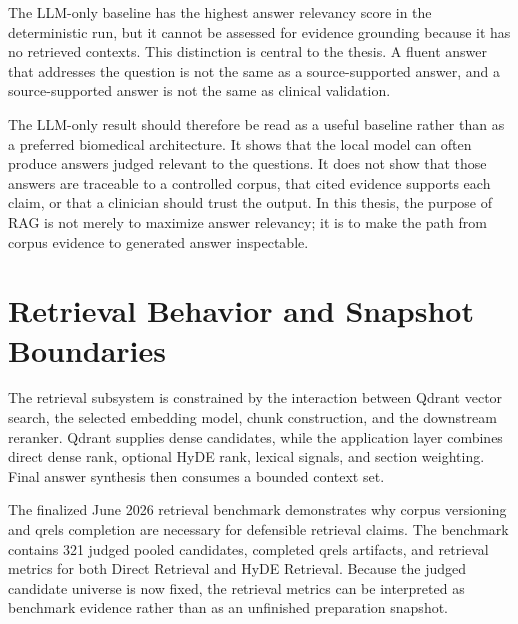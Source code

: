 The LLM-only baseline has the highest answer relevancy score in the deterministic run, but it cannot be assessed for evidence grounding because it has no retrieved contexts. This distinction is central to the thesis. A fluent answer that addresses the question is not the same as a source-supported answer, and a source-supported answer is not the same as clinical validation.

The LLM-only result should therefore be read as a useful baseline rather than as a preferred biomedical architecture. It shows that the local model can often produce answers judged relevant to the questions. It does not show that those answers are traceable to a controlled corpus, that cited evidence supports each claim, or that a clinician should trust the output. In this thesis, the purpose of RAG is not merely to maximize answer relevancy; it is to make the path from corpus evidence to generated answer inspectable.

\section{Retrieval Behavior and Snapshot Boundaries}

The retrieval subsystem is constrained by the interaction between Qdrant vector search, the selected embedding model, chunk construction, and the downstream reranker. Qdrant supplies dense candidates, while the application layer combines direct dense rank, optional HyDE rank, lexical signals, and section weighting. Final answer synthesis then consumes a bounded context set.

The finalized June 2026 retrieval benchmark demonstrates why corpus versioning and qrels completion are necessary for defensible retrieval claims. The benchmark contains 321 judged pooled candidates, completed qrels artifacts, and retrieval metrics for both Direct Retrieval and HyDE Retrieval. Because the judged candidate universe is now fixed, the retrieval metrics can be interpreted as benchmark evidence rather than as an unfinished preparation snapshot.

